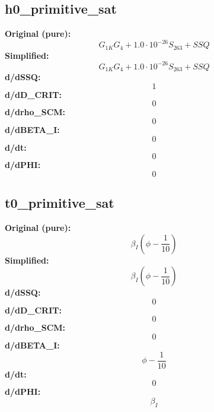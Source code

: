 \subsection{h0_primitive_sat}
\textbf{Original (pure):}
\begin{equation}
G_{1 K} G_{4} + 1.0 \cdot 10^{-26} S_{26 3} + SSQ
\end{equation}
\textbf{Simplified:}
\begin{equation}
G_{1 K} G_{4} + 1.0 \cdot 10^{-26} S_{26 3} + SSQ
\end{equation}
\textbf{d/dSSQ:}
\begin{equation}
1
\end{equation}
\textbf{d/dD_CRIT:}
\begin{equation}
0
\end{equation}
\textbf{d/drho_SCM:}
\begin{equation}
0
\end{equation}
\textbf{d/dBETA_I:}
\begin{equation}
0
\end{equation}
\textbf{d/dt:}
\begin{equation}
0
\end{equation}
\textbf{d/dPHI:}
\begin{equation}
0
\end{equation}

\subsection{t0_primitive_sat}
\textbf{Original (pure):}
\begin{equation}
\beta_{I} \left(\phi - \frac{1}{10}\right)
\end{equation}
\textbf{Simplified:}
\begin{equation}
\beta_{I} \left(\phi - \frac{1}{10}\right)
\end{equation}
\textbf{d/dSSQ:}
\begin{equation}
0
\end{equation}
\textbf{d/dD_CRIT:}
\begin{equation}
0
\end{equation}
\textbf{d/drho_SCM:}
\begin{equation}
0
\end{equation}
\textbf{d/dBETA_I:}
\begin{equation}
\phi - \frac{1}{10}
\end{equation}
\textbf{d/dt:}
\begin{equation}
0
\end{equation}
\textbf{d/dPHI:}
\begin{equation}
\beta_{I}
\end{equation}


